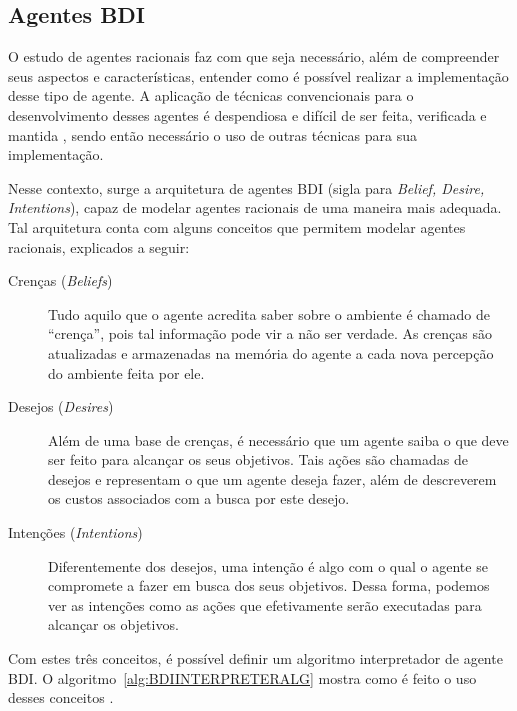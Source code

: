 \subsection{Agentes BDI}
O estudo de agentes racionais faz com que seja necessário, além de
compreender seus aspectos e características, entender como é possível
realizar a implementação desse tipo de agente. A aplicação de técnicas
convencionais para o desenvolvimento desses agentes é despendiosa e
difícil de ser feita, verificada e mantida \cite{bdi-icmas95}, sendo
então necessário o uso de outras técnicas para sua implementação.

Nesse contexto, surge a arquitetura de agentes BDI (sigla para \textit{Belief,
Desire, Intentions}), capaz de modelar agentes racionais de uma maneira mais
adequada. Tal arquitetura conta com alguns conceitos que permitem modelar
agentes racionais, explicados a seguir:

\begin{description}
\item [Crenças (\textit{Beliefs})]
Tudo aquilo que o agente acredita saber sobre o ambiente é chamado de
``crença'', pois tal informação pode vir a não ser verdade.  As crenças são
atualizadas e armazenadas na memória do agente a cada nova percepção do
ambiente feita por ele.

\item [Desejos (\textit{Desires})]
Além de uma base de crenças, é necessário que um agente saiba o que deve ser
feito para alcançar os seus objetivos. Tais ações são chamadas de desejos e
representam o que um agente deseja fazer, além de descreverem os custos
associados com a busca por este desejo.

\item [Intenções (\textit{Intentions})]
Diferentemente dos desejos, uma intenção é algo com o qual o agente se
compromete a fazer em busca dos seus objetivos. Dessa forma, podemos ver as
intenções como as ações que efetivamente serão executadas para alcançar os
objetivos.
\end{description}

Com estes três conceitos, é possível definir um algoritmo interpretador de
agente BDI. O algoritmo~\ref{alg:BDIINTERPRETERALG} mostra como é feito o uso
desses conceitos \cite{BDIFROMTHEORYTOPRACTICE}.

